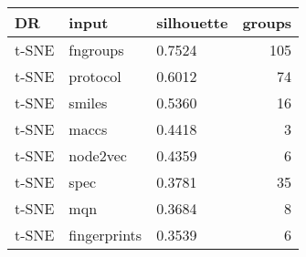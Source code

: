 \begin{tabular}{lllr}
\toprule
    DR &         input & silhouette &  groups \\
\midrule
t-SNE &      fngroups &     0.7524 &     105 \\
t-SNE &      protocol &     0.6012 &      74 \\
t-SNE &        smiles &     0.5360 &      16 \\
t-SNE &         maccs &     0.4418 &       3 \\
t-SNE &      node2vec &     0.4359 &       6 \\
t-SNE &          spec &     0.3781 &      35 \\
t-SNE &           mqn &     0.3684 &       8 \\
t-SNE &  fingerprints &     0.3539 &       6 \\
\bottomrule
\end{tabular}